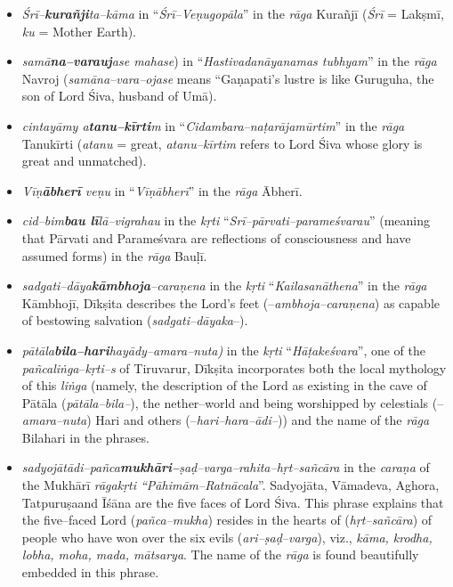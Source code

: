 \begin{itemize}
\item \textit{Śrī–\textbf{kurañji}ta–kāma} in “\textit{Śrī–Veṇugopāla}” in the \textit{rāga} Kurañjī (\textit{Śrī} = Lakṣmī, \textit{ku} = Mother Earth).

 \item \textit{samā\textbf{na–varauj}ase mahase}) in “\textit{Hastivadanāyanamas tubhyam}” in the \textit{rāga} Navroj (\textit{samāna–vara–ojase} means “Gaṇapati’s lustre is like Guruguha, the son of Lord Śiva, husband of Umā).

 \item \textit{cintayāmy a\textbf{tanu–kīrti}m} in “\textit{Cidambara–naṭarājamūrtim}” in the \textit{rāga} Tanukīrti (\textit{atanu} = great, \textit{atanu–kīrtim} refers to Lord Śiva whose glory is great and unmatched).

 \item \textit{Vīṇ\textbf{ābherī} veṇu} in “\textit{Vīṇābherī}” in the \textit{rāga} Ābherī.

 \item \textit{cid–bim\textbf{bau lī}lā–vigrahau} in the \textit{kṛti} “\textit{Srī–pārvati–parameśvarau}” (meaning that Pārvati and Parameśvara are reflections of consciousness and have assumed forms) in the \textit{rāga} Bauḷī.

 \item \textit{sadgati–dāya\textbf{kāmbhoja}–caraṇena} in the \textit{kṛti} “\textit{Kailasanāthena}” in the \textit{rāga} Kāmbhojī, Dīkṣita describes the Lord’s feet (–\textit{ambhoja–caraṇena}) as capable of bestowing salvation (\textit{sadgati–dāyaka}–).

 \item \textit{pātāla\textbf{bila–hari}hayādy–amara–nuta)} in the \textit{kṛti} “\textit{Hāṭakeśvara}”, one of the \textit{pañcaliṅga}–\textit{kṛti–s} of Tiruvarur, Dīkṣita incorporates both the local mythology of this \textit{liṅga} (namely, the description of the Lord as existing in the cave of Pātāla (\textit{pātāla–bila–}), the nether–world and being worshipped by celestials (–\textit{amara–nuta}) Hari and others (–\textit{hari–hara–ādi–})) and the name of the \textit{rāga} Bilahari in the phrases.

 \item \textit{sadyojātādi–pañca\textbf{mukhāri–}ṣaḍ–varga–rahita–hṛt–sañcāra} in the \textit{caraṇa} of the Mukhārī\textit{ rāgakṛti “Pāhimām–Ratnācala}”. Sadyojāta, Vāmadeva, Aghora, Tatpuruṣaand Īśāna are the five faces of Lord Śiva. This phrase explains that the five–faced Lord (\textit{pañca–mukha}) resides in the hearts of (\textit{hṛt–sañcāra}) of people who have won over the six evils (\textit{ari–ṣaḍ–varga}), viz., \textit{kāma, krodha, lobha, moha, mada, mātsarya}. The name of the \textit{rāga} is found beautifully embedded in this phrase.


\end{itemize}
